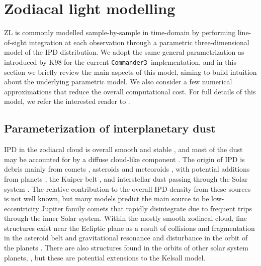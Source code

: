 \documentclass[twocolumn]{aa}
\def\commanderthree{\texttt{Commander3}}
\begin{document}
\section{Zodiacal light modelling}\label{sect:zodi-model}
ZL is commonly modelled sample-by-sample in time-domain by performing
line-of-sight integration at each observation through a parametric
three-dimensional model of the IPD distribution. We adopt the same
general parametrization as introduced by K98 for the current
\commanderthree\ implementation, and in this section we briefly review
the main aspects of this model, aiming to build intuition about the
underlying parametric model. We also consider a few numerical
approximations that reduce the overall computational cost. For full
details of this model, we refer the interested reader to
\citet{Kelsall1998}.

\subsection{Parameterization of interplanetary dust}
IPD in the zodiacal cloud is overall smooth and stable 
\citep{Leinert1989}, and most of the dust may be accounted for by a 
diffuse cloud-like component \citep{Kelsall1998}. The origin of IPD 
is debris mainly from comets \citep{Liou1995, ipatov, rigley}, asteroids \citep{Dermott1984} and meteoroids \citep{dikarev}, 
with potential additions from planets \citep{Jorgensen2021}, 
the Kuiper belt \citep{Mann2009}, and interstellar dust passing 
through the Solar system \citep{Robinson2013}. The relative contribution to the overall 
IPD density from these sources is not well known, but many models predict the main 
source to be low-eccentricity Jupiter family comets that rapidly 
disintegrate due to frequent trips through the inner Solar system.
Within the mostly smooth zodiacal cloud, fine structures exist near the Ecliptic plane as a result 
of collisions and fragmentation in the asteroid belt and gravitational 
resonance and disturbance in the orbit of the planets \citep{Low1984, Dermott1984, Dermott1994, Reach1997}. There are also structures found in the orbits of other solar system planets, \citep{kennedy, jones_venus, Stenborg}, but these are potential extensions to the Kelsall model.  
\end{document}
